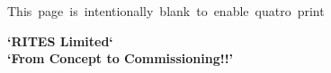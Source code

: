 \documentclass[11pt,twoside,openany,svgnames,x11names]{gkbookm1}
\begin{document}
%



\clearpage
\pagestyle{empty}\newpage\mbox{This page is intentionally blank to enable quatro print}


% 
\clearpage
\enlargethispage{3\baselineskip}
\thispagestyle{empty}

\pagecolor[HTML]{0E0407}   %

\begin{center}
\begin{minipage}{.8\textwidth}
\color{Cornsilk}\Large\bfseries

\begin{center}
\huge\bfseries\sffamily\color{lime}`RITES Limited` \\ `From Concept to Commissioning!!'
\end{center}




\end{minipage}
\end{center}


\end{document}
